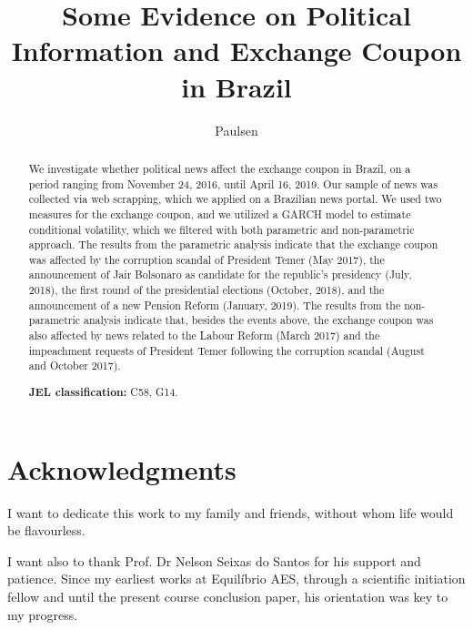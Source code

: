 \documentclass[cic,tc, english]{iiufrgs}
\title{Some Evidence on Political Information and Exchange Coupon in Brazil}
\author{Paulsen}{Bernardo Hillesheim}
\begin{document}
\chapter*{Acknowledgments}


I want to dedicate this work to my family and friends, without whom life would be flavourless. 

I want also to thank Prof. Dr Nelson Seixas do Santos for his support and patience. Since my earliest works at Equilíbrio AES, through a scientific initiation fellow and until the present course conclusion paper, his orientation was key to my progress.


\begin{abstract}
    We investigate whether political news affect the exchange coupon in Brazil, on a period ranging from November 24, 2016, until April 16, 2019. Our sample of news was collected via web scrapping, which we applied on a Brazilian news portal. We used two measures for the exchange coupon, and we utilized a GARCH model to estimate conditional volatility, which we filtered with both parametric and non-parametric approach. The results from the parametric analysis indicate that the exchange coupon was affected by the corruption scandal of President Temer (May 2017), the announcement of Jair Bolsonaro as candidate for the republic's presidency (July, 2018), the first round of the presidential elections (October, 2018), and the announcement of a new Pension Reform (January, 2019). The results from the non-parametric analysis indicate that, besides the events above, the exchange coupon was also affected by news related to the Labour Reform (March 2017) and the impeachment requests of President Temer following the corruption scandal (August and October 2017).
    
    \noindent
    \textbf{JEL classification:} C58, G14.
    
\end{abstract}

\listoffigures

\listoftables
\end{document}
